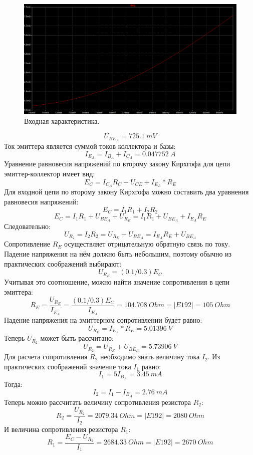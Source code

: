 \documentclass[12pt]{article}
\begin{document}
\begin{figure}[H]
    \centering
    \includegraphics[width=\textwidth]{3_input_char.png}
    \caption{Входная характеристика.}
    \label{fig:3_input_char.png}
\end{figure}

\[
U_{BE_A} = 725.1 \ mV
\]
Ток эмиттера является суммой токов коллектора и базы:
\[
I_{E_A} = I_{B_A} + I_{C_A} = 0.047752 \ A
\]
Уравнение равновесия напряжений по второму закону Кирхгофа для цепи эмиттер-коллектор имеет вид:
\[
E_C = I_{C_A} R_C + U_{CE} + I_{E_A} * R_E
\]
Для входной цепи по второму закону Кирхгофа можно составить два уравнения равновесия напряжений:
\[
E_C = I_1 R_1 + I_2 R_2
\]
\[
E_C = I_1 R_1 + U_{BE_A} + U_{R_E} = I_1 R_1 + U_{BE_A} + I_{E_A} R_E
\]
Следовательно:
\[
U_{R_2} = I_2 R_2 = U_{R_E} + U_{BE_A} = I_{E_A} R_E + U_{BE_A}
\]
Сопротивление $R_E$ осуществляет отрицательную обратную связь по току. Падение напряжения на нём должно быть небольшим, поэтому обычно из практических соображений выбирают:
\[
U_{R_E} = (0.1 / 0.3) E_C
\]
Учитывая это соотношение, можно найти значение сопротивления в цепи эмиттера:
\[
    R_E = \frac{U_{R_E}}{I_{E_A}} = \frac{(0.1/0.3)E_C}{I_{E_A}} = 104.708 \ Ohm = |E192| = 105 \ Ohm 
\]
Падение напряжения на эмиттерном сопротивлении будет равно:
\[
U_{R_E} = I_{E_A} * R_E = 5.01396 \ V
\]
Теперь $U_{R_2}$ может быть рассчитано:
\[
U_{R_2} = U_{R_E} + U_{BE_A} = 5.73906 \ V
\]
Для расчета сопротивления $R_2$ необходимо знать величину тока $I_2$. Из практических соображений значение тока $I_1$ равно:
\[
I_1 = 5 I_{B_A} = 3.45 \ mA
\]
Тогда:
\[
I_2 = I_1 - I_{B_A} = 2.76 \ mA
\]
Теперь можно рассчитать величину сопротивления резистора $R_2$:
\[
R_2 = \frac{U_{R_2}}{I_2} = 2079.34 \ Ohm = |E192| = 2080 \ Ohm
\]
И величина сопротивления резистора $R_1$:
\[
R_1 = \frac{E_C - U_{R_2}}{I_1} = 2684.33 \ Ohm = |E192| = 2670 \ Ohm
\]
\end{document}
